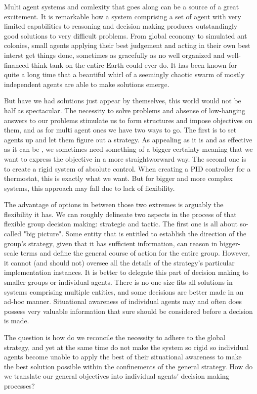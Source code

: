 Multi agent systems and comlexity that goes along can be a source of a great excitement. It is remarkable how a system
comprising a set of agent with very limited capabilities to reasoning and decision making produces outstandingly good
solutions to very difficult problems. From global economy to simulated ant colonies, small agents applying their best
judgement and acting in their own best interst get things done, sometimes as gracefully as no well organized and
well-financed think tank on the entire Earth could ever do. It has been known for quite a long time that a beautiful
whirl of a seemingly chaotic swarm of mostly independent agents are able to make solutions emerge.

But have we had solutions just appear by themselves, this world would not be half as spectacular. The necessity to solve
problems and absense of low-hanging answers to our problems stimulate us to form structures and impose objectives on
them, and as for multi agent ones we have two ways to go. The first is to set agents up and let them figure out a
strategy. As appealing as it is and as effective as it can be \cite{dorigo-2006}, we sometimes need something of a
bigger certainty meaning that we want to express the objective in a more straightworward way. The second one is to
create a rigid system of absolute control. When creating a PID controller for a thermostat, this is exactly what we
want. But for bigger and more complex systems, this approach may fall due to lack of flexibility.

The advantage of options in between those two extremes is arguably the flexibility it has. We can roughly delineate two
aspects in the process of that flexible group decision making: strategic and tactic. The first one is all about
so-called "big picture". Some entity that is entitled to establish the direction of the group's strategy, given that it
has sufficient information, can reason in bigger-scale terms and define the general course of action for the entire
group. However, it cannot (and should not) oversee all the details of the strategy's particular implementation
instances. It is better to delegate this part of decision making to smaller groups or individual agents. There is no
one-size-fits-all solutions in systems comprising multiple entities, and some decisions are better made in an ad-hoc
manner.
Situational awareness \cite{endsley-1995} of individual agents may and often does possess very valuable information that
sure should be considered before a decision is made.

The question is how do we reconcile the necessity to adhere to the global strategy, and yet at the same time do not make
the system so rigid so individual agents become unable to apply the best of their situational awareness to make the best
solution possible within the confinements of the general strategy. How do we translate our general objectives into
individual agents' decision making processes?
